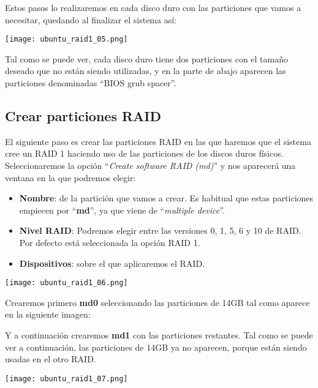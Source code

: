 Estos pasos lo realizaremos en cada disco duro con las particiones que vamos a necesitar, quedando al finalizar el sistema así:

\begin{center}
    \texttt{[image: ubuntu\_raid1\_05.png]}
\end{center}

Tal como se puede ver, cada disco duro tiene dos particiones con el tamaño deseado que no están siendo utilizadas, y en la parte de abajo aparecen las particiones denominadas “BIOS grub spacer”.


\subsection{Crear particiones RAID}
El siguiente paso es crear las particiones RAID en las que haremos que el sistema cree un RAID 1 haciendo uso de las particiones de los discos duros físicos. Seleccionaremos la opción “\textit{Create software RAID (md)}” y nos aparecerá una ventana en la que podremos elegir:

{
    \begin{minipage}{9cm}
        \begin{itemize}
            \item \textbf{Nombre}: de la partición que vamos a crear. Es habitual que estas particiones empiecen por “\textbf{md}”, ya que viene de “\textit{multiple device}”.
            \item \textbf{Nivel RAID}: Podremos elegir entre las versiones 0, 1, 5, 6 y 10 de RAID. Por defecto está seleccionada la opción RAID 1.
            \item  \textbf{Dispositivos}: sobre el que aplicaremos el RAID.
        \end{itemize}
    \end{minipage}
    \hfill
    \begin{minipage}{7cm}
        \texttt{[image: ubuntu\_raid1\_06.png]}
    \end{minipage}
}


Crearemos primero \textbf{md0} seleccionando las particiones de 14GB tal como aparece en la siguiente imagen:

Y a continuación crearemos \textbf{md1} con las particiones restantes. Tal como se puede ver a continuación, las particiones de 14GB ya no aparecen, porque están siendo usadas en el otro RAID.

\begin{center}
    \texttt{[image: ubuntu\_raid1\_07.png]}
\end{center}


